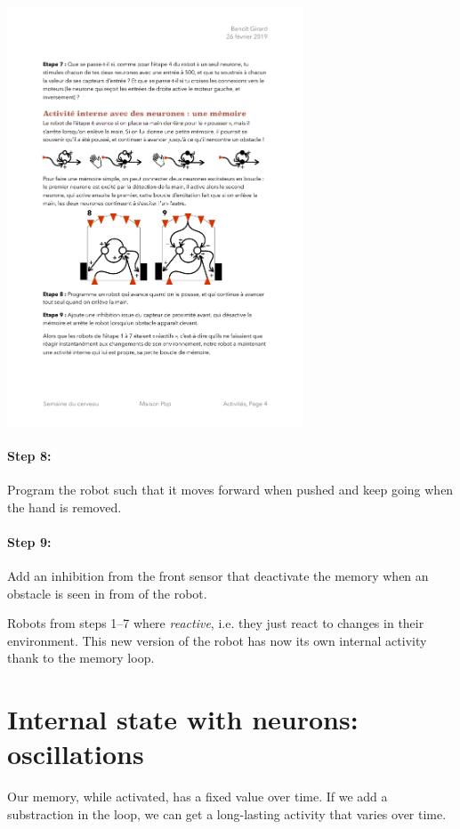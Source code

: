 \documentclass[12pt]{article}
\begin{document}
\begin{center}
\includegraphics[width=0.66\textwidth]{../Etapes8-9.pdf}
\end{center}

\paragraph{Step 8:} Program the robot such that it moves forward when pushed and keep going when the hand is removed.

\paragraph{Step 9:} Add an inhibition from the front sensor that deactivate the memory when an obstacle is seen in from of the robot.

Robots from steps 1--7 where \emph{reactive}, i.e. they just react to changes in their environment. This new version of the robot has now its own internal activity thank to the memory loop.

\section{Internal state with neurons: oscillations}

Our memory, while activated, has a fixed value over time. If we add a substraction in the loop, we can get a long-lasting activity that varies over time.
\end{document}
